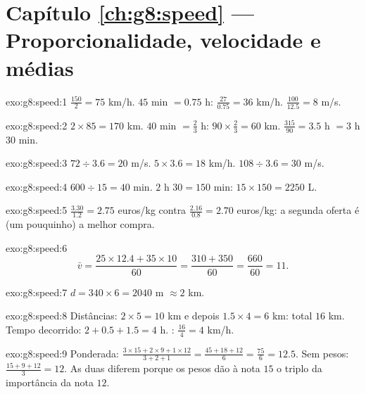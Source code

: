 \section*{Capítulo \ref{ch:g8:speed} --- Proporcionalidade, velocidade e médias}

\begin{solution}{exo:g8:speed:1}
$\frac{150}{2} = 75$ km/h. \quad
$45$ min $= 0.75$ h: $\frac{27}{0.75} = 36$ km/h. \quad
$\frac{100}{12.5} = 8$ m/s.
\end{solution}

\begin{solution}{exo:g8:speed:2}
$2 \times 85 = 170$ km. \quad
$40$ min $= \frac23$ h: $90 \times \frac23 = 60$ km. \quad
$\frac{315}{90} = 3.5$ h $= 3$ h $30$ min.
\end{solution}

\begin{solution}{exo:g8:speed:3}
$72 \div 3.6 = 20$ m/s. \quad
$5 \times 3.6 = 18$ km/h. \quad
$108 \div 3.6 = 30$ m/s.
\end{solution}

\begin{solution}{exo:g8:speed:4}
$600 \div 15 = 40$ min. \quad
$2$ h $30 = 150$ min: $15 \times 150 = 2250$ L.
\end{solution}

\begin{solution}{exo:g8:speed:5}
$\frac{3.30}{1.2} = 2.75$ euros/kg contra
$\frac{2.16}{0.8} = 2.70$ euros/kg: a segunda oferta é (um pouquinho)
a melhor compra.
\end{solution}

\begin{solution}{exo:g8:speed:6}
\[
\bar v = \frac{25 \times 12.4 + 35 \times 10}{60}
= \frac{310 + 350}{60} = \frac{660}{60} = 11 .
\]
\end{solution}

\begin{solution}{exo:g8:speed:7}
$d = 340 \times 6 = 2040$ m $\approx 2$ km.
\end{solution}

\begin{solution}{exo:g8:speed:8}
Distâncias: $2 \times 5 = 10$ km e depois $1.5 \times 4 = 6$ km: total
$16$ km. Tempo decorrido: $2 + 0.5 + 1.5 = 4$ h. :
$\frac{16}{4} = 4$ km/h.
\end{solution}

\begin{solution}{exo:g8:speed:9}
Ponderada:
$\frac{3 \times 15 + 2 \times 9 + 1 \times 12}{3 + 2 + 1}
= \frac{45 + 18 + 12}{6} = \frac{75}{6} = 12.5$.
Sem pesos: $\frac{15 + 9 + 12}{3} = 12$. As duas diferem porque os
pesos dão à nota $15$ o triplo da importância da nota $12$.
\end{solution}

